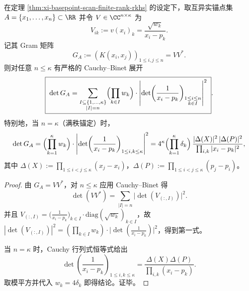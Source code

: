 \begin{proposition}\label{prop:xi-basepoint-scan-anchor-det-cauchy-vandermonde}
在定理 \ref{thm:xi-basepoint-scan-finite-rank-rkhs} 的设定下，取互异实锚点集
\(
A=\{x_1,\dots,x_n\}\subset\RR
\)
并令 \(V\in\CC^{n\times\kappa}\) 为
\[
V_{ik}:=v(x_i)_k=\frac{\sqrt{w_k}}{x_i-p_k}.
\]
记其 Gram 矩阵
\[
G_A:=(K(x_i,x_j))_{1\le i,j\le n}=VV^\ast.
\]
则对任意 \(n\le \kappa\) 有严格的 Cauchy--Binet 展开
\[
\boxed{\;
\det G_A
=\sum_{\substack{I\subseteq\{1,\dots,\kappa\}\\ |I|=n}}
\Bigl(\prod_{k\in I}w_k\Bigr)\cdot
\left|\det\!\left(\frac{1}{x_i-p_k}\right)_{\substack{1\le i\le n\\ k\in I}}\right|^2\; }.
\]
特别地，当 \(n=\kappa\)（满秩锚定）时，
\[
\det G_A=\Bigl(\prod_{k=1}^{\kappa}w_k\Bigr)\cdot
\left|\det\!\left(\frac{1}{x_i-p_k}\right)_{1\le i,k\le\kappa}\right|^2
=4^\kappa\Bigl(\prod_{k=1}^{\kappa}\delta_k\Bigr)\,
\frac{|\Delta(X)|^2\,|\Delta(P)|^2}{\prod_{i,k}|x_i-p_k|^2},
\]
其中 \(\Delta(X):=\prod_{1\le i<j\le \kappa}(x_j-x_i)\)，\(\Delta(P):=\prod_{1\le i<j\le \kappa}(p_j-p_i)\)。
\end{proposition}
\begin{proof}
由 \(G_A=VV^\ast\)，对 \(n\le\kappa\) 应用 Cauchy--Binet 得
\[
\det(VV^\ast)
=\sum_{|I|=n}\bigl|\det(V_{(:,I)})\bigr|^2.
\]
并且 \(V_{(:,I)}=\bigl(\frac{1}{x_i-p_k}\bigr)_{k\in I}\cdot \mathrm{diag}(\sqrt{w_k})_{k\in I}\)，故
\(
|\det(V_{(:,I)})|^2
=(\prod_{k\in I}w_k)\cdot\bigl|\det(\frac{1}{x_i-p_k})\bigr|^2
\)，得到第一式。
\par
当 \(n=\kappa\) 时，Cauchy 行列式恒等式给出
\[
\det\!\left(\frac{1}{x_i-p_k}\right)_{1\le i,k\le\kappa}
=\frac{\Delta(X)\Delta(P)}{\prod_{i,k}(x_i-p_k)}.
\]
取模平方并代入 \(w_k=4\delta_k\) 即得结论。证毕。
\end{proof}


